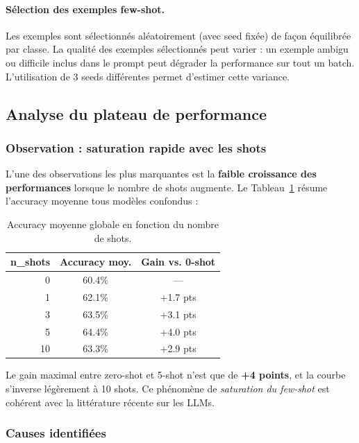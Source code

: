 \paragraph{Sélection des exemples few-shot.}
Les exemples sont sélectionnés aléatoirement (avec seed fixée) de façon équilibrée par classe. La qualité des exemples sélectionnés peut varier : un exemple ambigu ou difficile inclus dans le prompt peut dégrader la performance sur tout un batch. L'utilisation de 3 seeds différentes permet d'estimer cette variance.

\subsection{Analyse du plateau de performance}

\subsubsection{Observation : saturation rapide avec les shots}

L'une des observations les plus marquantes est la \textbf{faible croissance des performances} lorsque le nombre de shots augmente. Le Tableau~\ref{tab:plateau} résume l'accuracy moyenne tous modèles confondus :

\begin{table}[h]
\centering
\caption{Accuracy moyenne globale en fonction du nombre de shots.}
\label{tab:plateau}
\begin{tabular}{rcc}
\toprule
\textbf{n\_shots} & \textbf{Accuracy moy.} & \textbf{Gain vs. 0-shot} \\
\midrule
0  & 60.4\% & ---      \\
1  & 62.1\% & +1.7 pts \\
3  & 63.5\% & +3.1 pts \\
5  & 64.4\% & +4.0 pts \\
10 & 63.3\% & +2.9 pts \\
\bottomrule
\end{tabular}
\end{table}

Le gain maximal entre zero-shot et 5-shot n'est que de \textbf{+4 points}, et la courbe s'inverse légèrement à 10 shots. Ce phénomène de \textit{saturation du few-shot} est cohérent avec la littérature récente sur les LLMs.

\subsubsection{Causes identifiées}

